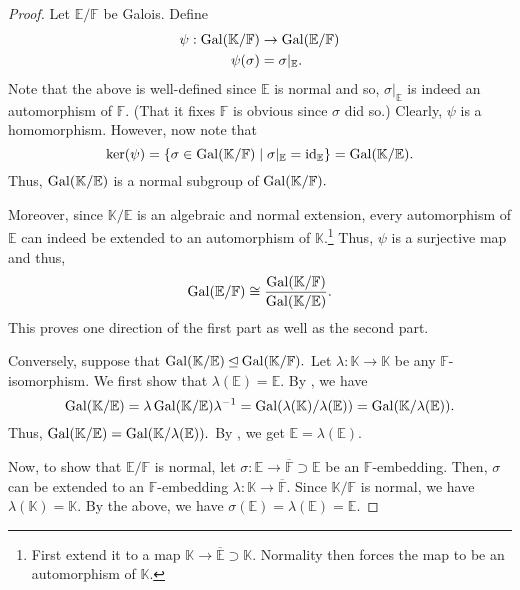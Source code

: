 \galoisiffnormal*\label{thm:galoisiffnormal2}
\begin{flushright}\hyperref[thm:galoisiffnormal]{\upsym}\end{flushright}
\begin{proof}
    Let $\mathbb{E}/\mathbb{F}$ be Galois. Define 
    \begin{align*} 
        \psi : \operatorname{Gal}(\mathbb{K}/\mathbb{F}) &\to \operatorname{Gal}(\mathbb{E}/\mathbb{F})\\
        \psi(\sigma) &= \sigma|_{\mathbb{E}}.
    \end{align*}
    Note that the above is well-defined since $\mathbb{E}$ is normal and so, $\sigma|_{\mathbb{E}}$ is indeed an automorphism of $\mathbb{F}.$ (That it fixes $\mathbb{F}$ is obvious since $\sigma$ did so.) Clearly, $\psi$ is a homomorphism. However, now note that
    \begin{equation*} 
        \ker(\psi) = \{\sigma \in \operatorname{Gal}(\mathbb{K}/\mathbb{F}) \mid \sigma|_{\mathbb{E}} = \operatorname{id}_{\mathbb{E}}\} = \operatorname{Gal}(\mathbb{K}/\mathbb{E}).
    \end{equation*}
    Thus, $\operatorname{Gal}(\mathbb{K}/\mathbb{E})$ is a normal subgroup of $\operatorname{Gal}(\mathbb{K}/\mathbb{F}).$

    Moreover, since $\mathbb{K}/\mathbb{E}$ is an algebraic and normal extension, every automorphism of $\mathbb{E}$ can indeed be extended to an automorphism of $\mathbb{K}.$\footnote{First extend it to a map $\mathbb{K} \to \overline{\mathbb{E}} \supset \mathbb{K}.$ Normality then forces the map to be an automorphism of $\mathbb{K}.$} Thus, $\psi$ is a surjective map and thus,
    \begin{equation*} 
        \operatorname{Gal}(\mathbb{E}/\mathbb{F}) \cong \frac{\operatorname{Gal}(\mathbb{K}/\mathbb{F})}{\operatorname{Gal}(\mathbb{K}/\mathbb{E})}.
    \end{equation*}
    This proves one direction of the first part as well as the second part.

    Conversely, suppose that $\operatorname{Gal}(\mathbb{K}/\mathbb{E}) \unlhd \operatorname{Gal}(\mathbb{K}/\mathbb{F}).$ Let $\lambda : \mathbb{K} \to \mathbb{K}$ be any $\mathbb{F}$-isomorphism. We first show that $\lambda(\mathbb{E}) = \mathbb{E}.$ By , we have
    \begin{equation*} 
        \operatorname{Gal}(\mathbb{K}/\mathbb{E}) = \lambda\operatorname{Gal}(\mathbb{K}/\mathbb{E})\lambda^{-1} = \operatorname{Gal}(\lambda(\mathbb{K})/\lambda(\mathbb{E})) = \operatorname{Gal}(\mathbb{K}/\lambda(\mathbb{E})).
    \end{equation*}
    Thus, $\operatorname{Gal}(\mathbb{K}/\mathbb{E}) = \operatorname{Gal}(\mathbb{K}/\lambda(\mathbb{E})).$ By , we get $\mathbb{E} = \lambda(\mathbb{E}).$

    Now, to show that $\mathbb{E}/\mathbb{F}$ is normal, let $\sigma : \mathbb{E} \to \overline{\mathbb{F}} \supset \mathbb{E}$ be an $\mathbb{F}$-embedding. Then, $\sigma$ can be extended to an $\mathbb{F}$-embedding $\lambda : \mathbb{K} \to \overline{\mathbb{F}}.$ Since $\mathbb{K}/\mathbb{F}$ is normal, we have $\lambda(\mathbb{K}) = \mathbb{K}.$ By the above, we have $\sigma(\mathbb{E}) = \lambda(\mathbb{E}) = \mathbb{E}.$
\end{proof}

